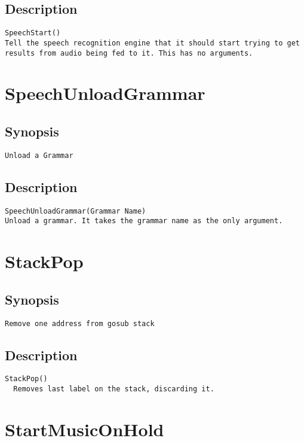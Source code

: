 \subsection{Description}
\begin{verbatim}
SpeechStart()
Tell the speech recognition engine that it should start trying to get results from audio being fed to it. This has no arguments.

\end{verbatim}


\section{SpeechUnloadGrammar}
\subsection{Synopsis}
\begin{verbatim}
Unload a Grammar
\end{verbatim}
\subsection{Description}
\begin{verbatim}
SpeechUnloadGrammar(Grammar Name)
Unload a grammar. It takes the grammar name as the only argument.

\end{verbatim}


\section{StackPop}
\subsection{Synopsis}
\begin{verbatim}
Remove one address from gosub stack
\end{verbatim}
\subsection{Description}
\begin{verbatim}
StackPop()
  Removes last label on the stack, discarding it.

\end{verbatim}


\section{StartMusicOnHold}
